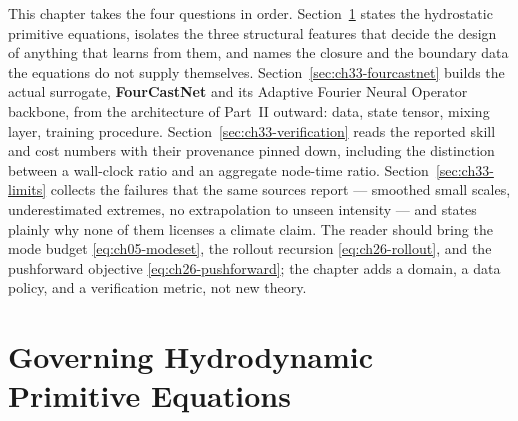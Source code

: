 This chapter takes the four questions in order. Section~\ref{sec:ch33-primitive} states the
hydrostatic primitive equations, isolates the three structural features that decide the
design of anything that learns from them, and names the closure and the boundary data the
equations do not supply themselves. Section~\ref{sec:ch33-fourcastnet} builds the actual
surrogate, \textbf{FourCastNet} and its Adaptive Fourier Neural Operator backbone, from the
architecture of Part~II outward: data, state tensor, mixing layer, training procedure.
Section~\ref{sec:ch33-verification} reads the reported skill and cost numbers with their
provenance pinned down, including the distinction between a wall-clock ratio and an
aggregate node-time ratio. Section~\ref{sec:ch33-limits} collects the failures that the same sources
report --- smoothed small scales, underestimated extremes, no extrapolation to unseen
intensity --- and states plainly why none of them licenses a climate claim. The reader
should bring the mode budget \eqref{eq:ch05-modeset}, the rollout recursion
\eqref{eq:ch26-rollout}, and the pushforward objective \eqref{eq:ch26-pushforward}; the
chapter adds a domain, a data policy, and a verification metric, not new theory.

\section{Governing Hydrodynamic Primitive Equations}
\label{sec:ch33-primitive}


